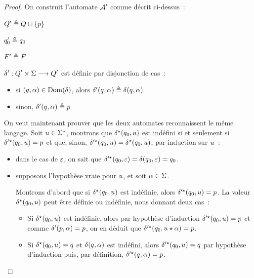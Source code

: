 \begin{proof}
  On construit l'automate $\mathcal{A}'$ comme décrit ci-dessus~:
  \begin{itemize}
    \begin{minipage}{0.3\textwidth}
    \item $Q_{}' \triangleq Q_{} \sqcup \{p\}$
    \end{minipage}
    \begin{minipage}{0.3\textwidth}
    \item $q_{0}' \triangleq q_{0}$
    \end{minipage}
    \begin{minipage}{0.3\textwidth}
    \item $F_{}' \triangleq F_{}$
    \end{minipage}
  \item $\delta_{}' : \displaystyle Q_{}'\times\Sigma \longrightarrow Q_{}'$ est définie par
    disjonction de cas~:
    \begin{itemize}
    \item si $(q_{},\alpha) \in \operatorname{Dom}(\delta_{})$, alors
      $\delta_{}'(q_{},\alpha) \triangleq \delta_{}(q_{},\alpha)$
    \item sinon, $\delta_{}'(q_{},\alpha) \triangleq p$
    \end{itemize}
  \end{itemize}

  On veut maintenant prouver que les deux automates reconnaissent le même
  langage. Soit $u \in \Sigma^{\star}$, montrons que $\delta_{}^{\star}(q_{0},u)$ est
  indéfini si et seulement si $\delta_{}'^{\star}(q_{0},u) = p$ et que, sinon,
  $\delta_{}'^{\star}(q_{0},u) = \delta_{}^{\star}(q_{0},u)$, par induction sur
  $u$~:
  \begin{itemize}
  \item dans le cas de $\varepsilon$, on sait que
    $\delta_{}'^{\star}(q_{0},\varepsilon) = \delta_{}(q_{0},\varepsilon) = q_{0}$.
  \item supposons l'hypothèse vraie pour $u$, et soit $\alpha \in \Sigma$.
    
    Montrons d'abord que si $\delta_{}^{\star}(q_{0},u)$ est indéfinie, alors
    $\delta_{}'^{\star}(q_{0},u) = p$.
    La valeur $\delta_{}^{\star}(q_{0},u)$ peut être définie ou indéfinie, nous
    donnant deux cas~:
    \begin{itemize}
    \item Si $\delta_{}^{\star}(q_{0},u)$ est indéfinie, alors par hypothèse
      d'induction $\delta_{}'^{\star}(q_{0},u) = p$ et comme
      $\delta_{}'(p,\alpha) = p$, on en déduit que
      $\delta_{}'^{\star}(q_{0},u\mathbin{\star}\alpha) = p$.
    \item Si $\delta_{}^{\star}(q_{0},u) = q_{}$ et $\delta_{}(q_{},\alpha)$ est
      indéfini, alors  $\delta_{}'^{\star}(q_{0},u) = q_{}$ par hypothèse
      d'induction puis, par définition, $\delta_{}'^{\star}(q_{},\alpha) = p$.
    \end{itemize}
    

\end{itemize}
\end{proof}
